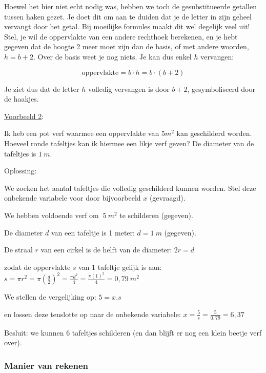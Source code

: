 Hoewel het hier niet echt nodig was, hebben we toch de gesubstitueerde
getallen tussen haken gezet. Je doet dit om aan te duiden dat je de
letter in zijn geheel vervangt door het getal. Bij moeilijke formules
maakt dit wel degelijk veel uit! Stel, je wil de oppervlakte van een
andere rechthoek berekenen, en je hebt gegeven dat de hoogte 2 meer
moet zijn dan de basis, of met andere woorden, $h=b+2$. Over de basis
weet je nog niets. Je kan dus enkel $h$ vervangen:

\begin{equation*}
\mathrm{oppervlakte}=b\cdot h=b\cdot(b+2)
\end{equation*}

Je ziet dus dat de letter $h$ volledig vervangen is door $b+2$,
gesymboliseerd door de haakjes.

\medskip{}


\uline{Voorbeeld 2}:

Ik heb een pot verf waarmee een oppervlakte van $5m^2$
kan geschilderd worden. Hoeveel ronde tafeltjes kan ik hiermee een
likje verf geven? De diameter van de tafeltjes is $1~m$.

Oplossing: 

We zoeken het aantal tafeltjes die volledig geschilderd kunnen worden.
Stel deze onbekende variabele voor door bijvoorbeeld $x$ (gevraagd).

We hebben voldoende verf om $~5~m^2$
te schilderen (gegeven).

De diameter $d$ van een tafeltje is 1 meter: $d=1~m$ (gegeven).

De straal $r$ van een cirkel is de helft van de diameter: $2r=d$

zodat de oppervlakte $s$ van 1 tafeltje gelijk is aan: $s=\pi r^{2}=\pi\left(\frac{d}{2}\right)^{2}=\frac{\pi d^{2}}{4}=\frac{\pi(1)^{2}}{4}=0,79~m^2$

We stellen de vergelijking op: $5=x.s$ 

en lossen deze tenslotte op naar de onbekende variabele: $x=\frac{5}{s}=\frac{5}{0,79}=6,37$

Besluit: we kunnen 6 tafeltjes schilderen (en dan blijft er nog een
klein beetje verf over).


\subsubsection{Manier van rekenen}

